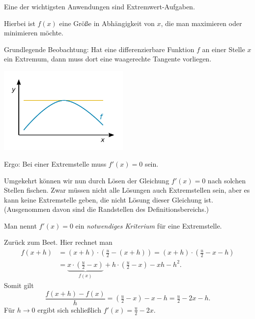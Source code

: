\documentclass[9pt]{beamer}
\begin{document}
\begin{frame}
Eine der wichtigsten Anwendungen sind Extremwert-Aufgaben.\pause

\vspace{0.8em}
Hierbei ist $f(x)$ eine Größe in Abhängigkeit von $x$, die
man maximieren oder minimieren möchte.
\end{frame}

\begin{frame}[t]
\vspace{3em}
Grundlegende Beobachtung: Hat eine differenzierbare Funktion $f$ an
einer Stelle $x$ ein Extremum, dann muss dort eine waagerechte
Tangente vorliegen.
\pause

\vspace{-0.5em}
\begin{center}
\includegraphics[width=64mm]{img/Maximum.pdf}
\end{center}
\end{frame}

\begin{frame}
Ergo: Bei einer Extremstelle muss $f'(x)=0$ sein.
\pause

\vspace{0.8em}
Umgekehrt können wir nun durch Lösen der Gleichung $f'(x)=0$ nach
solchen Stellen fischen. Zwar müssen nicht alle Lösungen auch
Extremstellen sein, aber es kann keine Extremstelle geben, die nicht
Lösung dieser Gleichung ist. {\footnotesize
(Ausgenommen davon sind die Randstellen des Definitionsbereichs.)}
\pause

\vspace{0.8em}
Man nennt $f'(x)=0$ ein \emph{notwendiges Kriterium} für eine
Extremstelle.
\end{frame}

\begin{frame}
Zurück zum Beet.\pause{} Hier rechnet man
\begin{align*}f(x+h) &= (x+h)\cdot(\tfrac{u}{2}-(x+h)) = (x+h)\cdot(\tfrac{u}{2}-x-h)\\
&= \underbrace{x\cdot(\tfrac{u}{2}-x)}_{f(x)} + h\cdot (\tfrac{u}{2}-x) - xh - h^2.
\end{align*}\pause
Somit gilt
\[\frac{f(x+h)-f(x)}{h} = (\tfrac{u}{2}-x) - x - h = \tfrac{u}{2}-2x-h.
\]\pause
Für $h\to 0$ ergibt sich schließlich $f'(x) = \tfrac{u}{2}-2x$.
\end{frame}
\end{document}

